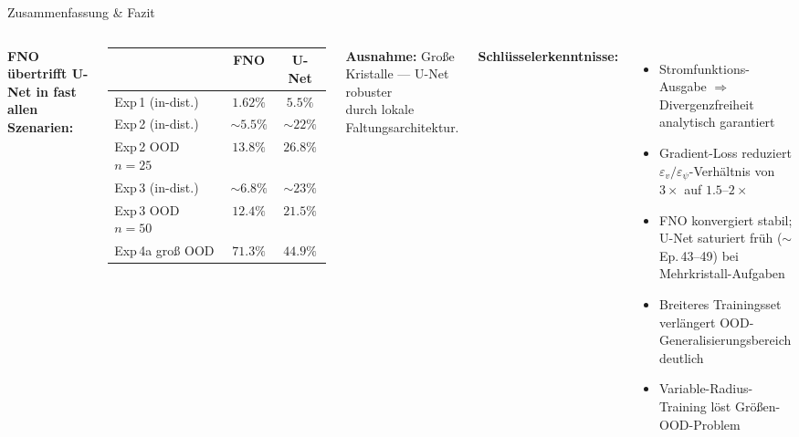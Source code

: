 \documentclass[aspectratio=169, 10pt]{beamer}
\begin{document}
\begin{frame}{Zusammenfassung \& Fazit}
\begin{columns}
\textbf{FNO übertrifft U-Net in fast allen Szenarien:}
\begin{table}
\small
\begin{tabular}{lcc}
\toprule
& FNO & U-Net \\
\midrule
Exp\,1 (in-dist.)   & $1.62\%$ & $5.5\%$ \\
Exp\,2 (in-dist.)   & $\sim5.5\%$ & $\sim22\%$ \\
Exp\,2 OOD $n=25$   & $13.8\%$ & $26.8\%$ \\
Exp\,3 (in-dist.)   & $\sim6.8\%$ & $\sim23\%$ \\
Exp\,3 OOD $n=50$   & $12.4\%$ & $21.5\%$ \\
\midrule
Exp\,4a groß OOD    & \alert{$71.3\%$} & $44.9\%$ \\
\bottomrule
\end{tabular}
\end{table}
\vspace{4pt}
\textbf{Ausnahme:} Große Kristalle — U-Net robuster\\durch lokale Faltungsarchitektur.

\textbf{Schlüsselerkenntnisse:}
\begin{itemize}
  \item Stromfunktions-Ausgabe $\Rightarrow$ Divergenzfreiheit analytisch garantiert
  \item Gradient-Loss reduziert $\varepsilon_v/\varepsilon_\psi$-Verhältnis von $3\times$ auf $1.5\text{–}2\times$
  \item FNO konvergiert stabil; U-Net saturiert früh ($\sim$Ep.\,43–49) bei Mehrkristall-Aufgaben
  \item Breiteres Trainingsset verlängert OOD-Generalisierungsbereich deutlich
  \item Variable-Radius-Training löst Größen-OOD-Problem
\end{itemize}
\end{columns}
\end{frame}
\end{document}
